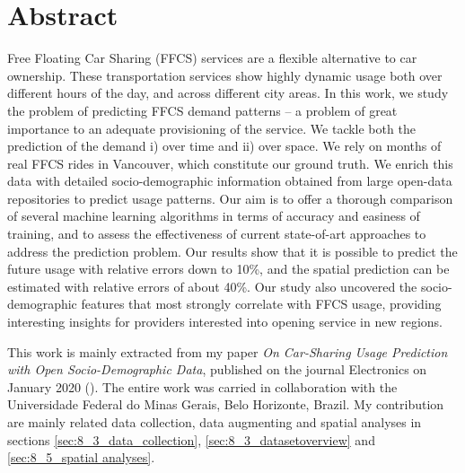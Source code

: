 \section{Abstract}
Free Floating Car Sharing (FFCS) services are a flexible alternative to car ownership. These transportation services show highly dynamic usage both over different hours of the day, and across different city areas. 
In this work, we study the problem of predicting FFCS demand patterns -- a problem of great importance to an adequate provisioning of the service. We tackle both the prediction of the demand i) over time and ii) over space. 
We rely on months of real FFCS rides in Vancouver, which constitute our ground truth. We enrich this data with detailed socio-demographic information obtained from large open-data repositories to predict usage patterns. 
Our aim is to offer a thorough comparison of several machine learning algorithms in terms of accuracy and easiness of training, and to assess the effectiveness of current state-of-art approaches to address the prediction problem.
Our results show that it is possible to predict the future usage with relative errors down to 10\%, and the spatial prediction can be estimated with relative errors of about 40\%.
Our study also uncovered the socio-demographic features that most strongly correlate with FFCS usage, providing interesting insights for providers interested into opening service in new regions.

This work is mainly extracted from my paper \textit{On Car-Sharing Usage Prediction with Open Socio-Demographic Data}, published on the journal Electronics on January 2020 (\cite{cocca2020predictions}). The entire work was carried in collaboration with the Universidade Federal do Minas Gerais, Belo Horizonte, Brazil. My contribution are mainly related data collection, data augmenting and spatial analyses in sections \ref{sec:8_3_data_collection}, \ref{sec:8_3_datasetoverview} and \ref{sec:8_5_spatial analyses}.



